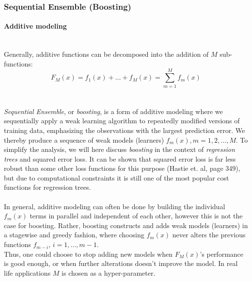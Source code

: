 \documentclass[10pt, a4paper, twocolumn]{article}
\newcommand{\myparagraph}[1]{\paragraph{#1}\mbox{}\\}
\begin{document}
			\subsubsection{Sequential Ensemble (Boosting)}
				\myparagraph{Additive modeling}
				Generally, additive functions can be decomposed into the addition of $M$ sub-functions:
				$$F_M(x)=f_1(x)+\dots+f_M(x)=\sum_{m=1}^M f_m(x)$$\\\\
				\emph{Sequential Ensemble}, or \emph{boosting}, is a form of additive modeling where we sequentially apply a weak learning algorithm to repeatedly modified versions of training data, emphasizing the observations with the largest prediction error. We thereby produce a sequence of weak models (learners) $f_m(x), m = 1, 2, \dots, M$. To simplify the analysis, we will here discuss \emph{boosting} in the context of \emph{regression trees} and squared error loss. It can be shown that squared error loss is far less robust than some other loss functions for this purpose (Hastie et. al, page 349\cite{ElementsOfStatLearning}), but due to computational constraints it is still one of the most popular cost functions for regression trees.\\\\				
				In general, additive modeling can often be done by building the individual $f_m(x)$ terms in parallel and independent of each other, however this is not the case for boosting. Rather, boosting constructs and adds weak models (learners) in a stagewise and greedy fashion, where choosing $f_m(x)$ never alters the previous functions $f_{m-i}$, $i=1,\dots,m-1$.\\				
				Thus, one could choose to stop adding new models when $F_M(x)$'s performance is good enough, or when further alterations doesn't improve the model. In real life applications $M$ is chosen as a hyper-parameter.
\end{document}
